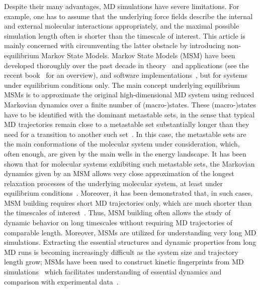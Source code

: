\documentclass[journal=jctcce,manuscript=article]{achemso}
\begin{document}
Despite their many advantages, MD simulations have severe limitations. For example, one has to assume that the underlying force fields  describe the internal and external molecular interactions appropriately, and the maximal possible simulation length often is shorter than the timescale of interest. 
This article is mainly concerned with circumventing the latter obstacle by introducing non-equilibrium Markov State Models. Markov State Models
(MSM) have been  developed thoroughly over the
past decade in theory~\cite{A19-31,prinz2011markov} and applications (see the recent book~\cite{A19-1} for an overview), and software implementations~\cite{A19-49, MSMBuilder}, but for systems under equilibrium conditions only.
The main concept underlying equilibrium MSMs is to approximate the original high-dimensional MD system 
using reduced Markovian dynamics over a finite number of (macro-)states. These (macro-)states
have to be identified with the dominant metastable sets, in the sense that
typical MD trajectories remain close to a metastable set substantially longer than
they need for a transition to another such set~\cite{A19-31,schuette2011markov}. In this case, the metastable sets are the main conformations of the molecular system under consideration, which, often enough, are given by the main wells in the energy landscape. 
It has been shown that for molecular systems exhibiting such metastable sets, the Markovian dynamics given by an MSM allows very close approximation of the longest relaxation processes of the underlying molecular system, at least under equilibrium conditions~\cite{sarich2010approximation,Eigenvalues}. 
Moreover, it has been demonstrated that, in such cases, MSM building requires short MD trajectories only, which are much shorter than the timescales of interest~\cite{PNAS09,kohlhoff2014cloud}.  
Thus, MSM building often allows the study of dynamic behavior on long timescales without requiring MD trajectories of comparable length.
Moreover, MSMs are utilized for understanding very long MD simulations. Extracting the essential structures and dynamic properties from long MD runs is
becoming increasingly difficult as the system size and trajectory length grow; MSMs have been used to construct kinetic fingerprints from MD simulations~\cite{A19-39} which facilitates understanding of essential dynamics and comparison with experimental data~\cite{PrinzKellerNoe_PCCP11_Perspective}.


\end{document}
